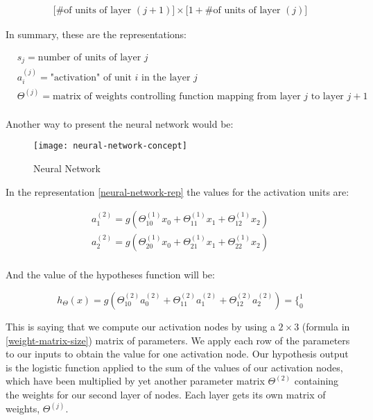 \begin{align}
\Big[\text{\# of units of layer } (j + 1)\Big] \times \Big[1 + \text{\# of units of layer } (j)\Big] \label{weight-matrix-size}
\end{align}

\newpage
\noindent In summary, these are the representations:

\begin{align*}
	& s_j = \text{number of units of layer } j \\
	& a^{(j)}_i = \text{"activation" of unit } i \text{ in the layer } j \\
	& \Theta^{(j)} = \text{matrix of weights controlling function mapping from layer } j \text{ to layer } j + 1 \\ 
\end{align*}

\noindent Another way to present the neural network would be:
\begin{figure}[h]
    \centering
    \texttt{[image: neural-network-concept]}
    \caption{Neural Network}
    \label{fig:neural-network-concept}
\end{figure}

\noindent In the representation \eqref{neural-network-rep} the values for the activation units are:

\begin{align*}
	a^{(2)}_1 = g(\Theta^{(1)}_{10}x_0 + \Theta^{(1)}_{11}x_1 + \Theta^{(1)}_{12}x_2) \\
	a^{(2)}_2 = g(\Theta^{(1)}_{20}x_0 + \Theta^{(1)}_{21}x_1 + \Theta^{(1)}_{22}x_2) \\
\end{align*}

\noindent And the value of the hypotheses function will be:

$$h_{\Theta}(x) = g(\Theta^{(2)}_{10}a^{(2)}_0 + \Theta^{(2)}_{11}a^{(2)}_1 + \Theta^{(2)}_{12}a^{(2)}_2) = \Big\{^1_0 $$

\noindent This is saying that we compute our activation nodes by using a $2 \times 3$ (formula in \ref{weight-matrix-size}) matrix of parameters. We apply each row of the parameters to our inputs to obtain the value for one activation node. Our hypothesis output is the logistic function applied to the sum of the values of our activation nodes, which have been multiplied by yet another parameter matrix $\Theta^{(2)}$ containing the weights for our second layer of nodes. Each layer gets its own matrix of weights, $\Theta^{(j)}$.


